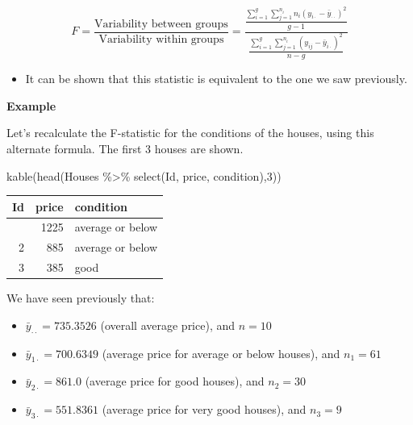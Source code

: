 \documentclass[
  letterpaper,
  DIV=11,
  numbers=noendperiod]{scrreprt}
\newenvironment{Shaded}{\begin{snugshade}}{\end{snugshade}}
\newcommand{\DecValTok}[1]{\textcolor[rgb]{0.68,0.00,0.00}{#1}}
\newcommand{\FunctionTok}[1]{\textcolor[rgb]{0.28,0.35,0.67}{#1}}
\newcommand{\NormalTok}[1]{\textcolor[rgb]{0.00,0.23,0.31}{#1}}
\newcommand{\SpecialCharTok}[1]{\textcolor[rgb]{0.37,0.37,0.37}{#1}}
\providecommand{\tightlist}{%
  \setlength{\itemsep}{0pt}\setlength{\parskip}{0pt}}\usepackage{longtable,booktabs,array}
\begin{document}
\[
F= \frac{\text{Variability between groups}}{\text{Variability within groups}}= \frac{\frac{\displaystyle\sum_{i=1}^g\sum_{j=1}^{n_i}n_i(y_{i\cdot}-\bar{y}_{\cdot\cdot})^2}{g-1}}{\frac{\displaystyle\sum_{i=1}^g\sum_{j=1}^{n_i}(y_{ij}-\bar{y}_{i\cdot})^2}{n-g}}
\]

\begin{itemize}
\tightlist
\item
  It can be shown that this statistic is equivalent to the one we saw
  previously.
\end{itemize}

\textbf{Example}

Let's recalculate the F-statistic for the conditions of the houses,
using this alternate formula. The first 3 houses are shown.

\begin{Shaded}
\begin{Highlighting}[]
\FunctionTok{kable}\NormalTok{(}\FunctionTok{head}\NormalTok{(Houses }\SpecialCharTok{\%\textgreater{}\%} \FunctionTok{select}\NormalTok{(Id, price, condition),}\DecValTok{3}\NormalTok{))}
\end{Highlighting}
\end{Shaded}

\begin{longtable}[]{@{}rrl@{}}
\toprule\noalign{}
Id & price & condition \\
\midrule\noalign{}
\endhead
\bottomrule\noalign{}
\endlastfoot
1 & 1225 & average or below \\
2 & 885 & average or below \\
3 & 385 & good \\
\end{longtable}

We have seen previously that:

\begin{itemize}
\tightlist
\item
  \(\bar{y}_{\cdot\cdot}=735.3526\) (overall average price), and
  \(n=10\)
\item
  \(\bar{y}_{1\cdot}=700.6349\) (average price for average or below
  houses), and \(n_1=61\)\\
\item
  \(\bar{y}_{2\cdot}=861.0\) (average price for good houses), and
  \(n_2=30\)\\
\item
  \(\bar{y}_{3\cdot}=551.8361\) (average price for very good houses),
  and \(n_3=9\)
\end{itemize}
\end{document}
